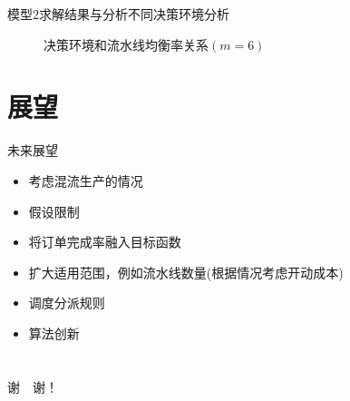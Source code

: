 \documentclass{beamer}
\begin{document}
\begin{frame}{模型2求解结果与分析}{不同决策环境分析}
\begin{figure}
\centering
{}
\caption{决策环境和流水线均衡率关系$(m = 6)$}
\end{figure}
\end{frame}
\section{展望}
\begin{frame}{未来展望}
\begin{itemize}[<+-| alert@+>]
\item 考虑混流生产的情况
\item 假设限制
\item 将订单完成率融入目标函数
\item 扩大适用范围，例如流水线数量(根据情况考虑开动成本)
\item 调度分派规则
\item 算法创新
\end{itemize}
\end{frame}
\section{ }
\begin{frame}
\centering
{}
谢~~谢！
\end{frame}
\end{document}
